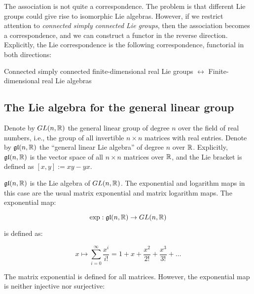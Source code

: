 The association is not quite a correspondence. The problem is that
different Lie groups could give rise to isomorphic Lie
algebras. However, if we restrict attention to {\em connected simply
  connected Lie groups}, then the association becomes a
correspondence, and we can construct a functor in the reverse
direction. Explicitly, the Lie correspondence is the following
correspondence, functorial in both directions:

\begin{center}
  Connected simply connected finite-dimensional real Lie groups
  $\leftrightarrow$ Finite-dimensional real Lie algebras
\end{center}

\subsection{The Lie algebra for the general linear group}\label{sec:lie-correspondence-gln}

Denote by $GL(n,\mathbb{R})$ the general linear group of degree $n$ over the
field of real numbers, i.e., the group of all invertible $n \times n$
matrices with real entries. Denote by $\mathfrak{g}\mathfrak{l}(n,\mathbb{R})$ the ``general linear
Lie algebra'' of degree $n$ over $\mathbb{R}$. Explicitly, $\mathfrak{g}\mathfrak{l}(n,\mathbb{R})$ is the
vector space of all $n \times n$ matrices over $\mathbb{R}$, and the Lie
bracket is defined as $[x,y] := xy - yx$.

$\mathfrak{g}\mathfrak{l}(n,\mathbb{R})$ is the Lie algebra of $GL(n,\mathbb{R})$. The
exponential and logarithm maps in this case are the usual matrix
exponential and matrix logarithm maps. The exponential map:

$$\exp: \mathfrak{g}\mathfrak{l}(n,\mathbb{R}) \to GL(n,\mathbb{R})$$

is defined as:

$$x \mapsto \sum_{i=0}^\infty \frac{x^i}{i!} = 1 + x + \frac{x^2}{2!} + \frac{x^3}{3!} + \dots$$

The matrix exponential is defined for all matrices. However, the
exponential map is neither injective nor surjective:

